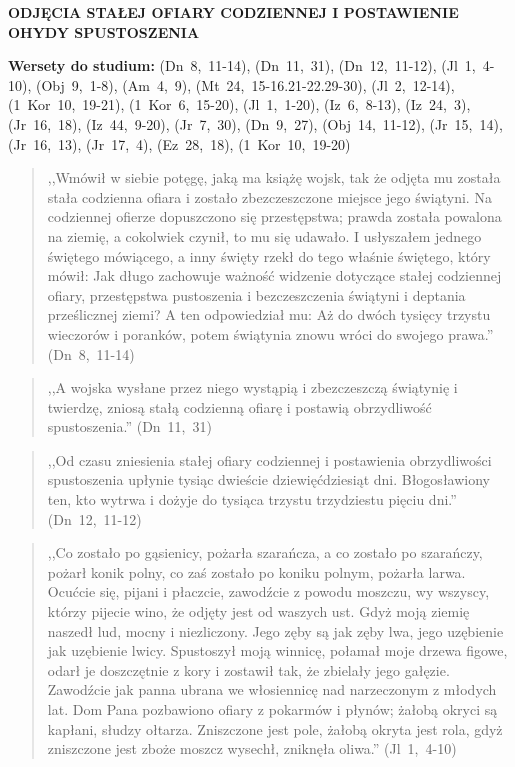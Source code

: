 \documentclass[10pt,a4paper,oneside]{article}
\begin{document}
\centerline{\textbf{\MakeUppercase{Odjęcia stałej ofiary codziennej i postawienie ohydy spustoszenia}}}
\begin{center}
\textbf{Wersety do studium:} (Dn~8,~11-14), (Dn~11,~31), (Dn~12,~11-12), (Jl~1,~4-10), (Obj~9,~1-8), (Am~4,~9), (Mt~24,~15-16.21-22.29-30), (Jl~2,~12-14), (1~Kor~10,~19-21), (1~Kor~6,~15-20), (Jl~1,~1-20), (Iz~6,~8-13), (Iz~24,~3), (Jr~16,~18), (Iz~44,~9-20), (Jr~7,~30), (Dn~9,~27), (Obj~14,~11-12), (Jr~15,~14), (Jr~16,~13), (Jr~17,~4), (Ez~28,~18), (1~Kor~10,~19-20)
\end{center}
\begin{quote}
,,Wmówił w siebie potęgę, jaką ma książę wojsk, tak że odjęta mu została stała codzienna ofiara i zostało zbezczeszczone miejsce jego świątyni. Na codziennej ofierze dopuszczono się przestępstwa; prawda została powalona na ziemię, a cokolwiek czynił, to mu się udawało. I usłyszałem jednego świętego mówiącego, a inny święty rzekł do tego właśnie świętego, który mówił: Jak długo zachowuje ważność widzenie dotyczące stałej codziennej ofiary, przestępstwa pustoszenia i bezczeszczenia świątyni i deptania prześlicznej ziemi? A ten odpowiedział mu: Aż do dwóch tysięcy trzystu wieczorów i poranków, potem świątynia znowu wróci do swojego prawa.'' (Dn~8,~11-14)
\end{quote}
\begin{quote}
,,A wojska wysłane przez niego wystąpią i zbezczeszczą świątynię i twierdzę, zniosą stałą codzienną ofiarę i postawią obrzydliwość spustoszenia.'' (Dn~11,~31)
\end{quote}
\begin{quote}
,,Od czasu zniesienia stałej ofiary codziennej i postawienia obrzydliwości spustoszenia upłynie tysiąc dwieście dziewięćdziesiąt dni. Błogosławiony ten, kto wytrwa i dożyje do tysiąca trzystu trzydziestu pięciu dni.'' (Dn~12,~11-12)
\end{quote}
\begin{quote}
,,Co zostało po gąsienicy, pożarła szarańcza, a co zostało po szarańczy, pożarł konik polny, co zaś zostało po koniku polnym, pożarła larwa. Ocućcie się, pijani i płaczcie, zawodźcie z powodu moszczu, wy wszyscy, którzy pijecie wino, że odjęty jest od waszych ust. Gdyż moją ziemię naszedł lud, mocny i niezliczony. Jego zęby są jak zęby lwa, jego uzębienie jak uzębienie lwicy. Spustoszył moją winnicę, połamał moje drzewa figowe, odarł je doszczętnie z kory i zostawił tak, że zbielały jego gałęzie. Zawodźcie jak panna ubrana we włosiennicę nad narzeczonym z młodych lat. Dom Pana pozbawiono ofiary z pokarmów i płynów; żałobą okryci są kapłani, słudzy ołtarza. Zniszczone jest pole, żałobą okryta jest rola, gdyż zniszczone jest zboże moszcz wysechł, zniknęła oliwa.'' (Jl~1,~4-10)
\end{quote}
\end{document}
